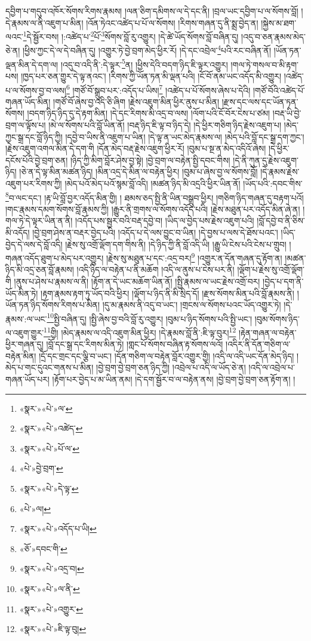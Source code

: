 དབྱིག་པ་གདུབ་འཁོར་སོགས་རིགས་རྣམས། །ལན་ཅིག་དམིགས་ལ་དེ་དང་ནི། །བྲལ་ཡང་དབྱིག་པ་ལ་སོགས་བློ། །དེ་རྣམས་ལ་ནི་འཇུག་པ་མིན། །འོན་ཏེའང་འཚེད་པ་པོ་ལ་སོགས། །རིགས་གཞན་དུ་ནི་སྨྲ་བྱེད་ན། །སྐྱེས་མ་ཐག་ལའང་\footnote{«སྣར་»«པེ་»ལ་}དེ་སྦྱོར་བས། །:འཚེད་པ་\footnote{«སྣར་»«པེ་»འཚེད་}པོ་\footnote{«སྣར་»«པེ་»པོ་ལ་}སོགས་བློ་རུ་འགྱུར། །དེ་ཚེ་ཡོད་སོགས་བློ་བཞིན་དུ། །འདུ་བ་ཅན་རྣམས་མེད་ཅེ་ན། །ཕྱིས་ཀྱང་དེ་ལ་དེ་བཞིན་དུ། །འགྱུར་ཏེ་བྱེ་བྲག་མེད་ཕྱིར་རོ། །དེ་དང་འབྲེལ་\footnote{«པེ་»བྱེ་བྲག་}པའི་རང་བཞིན་ནོ། །ཡོན་ཏན་ལྡན་མིན་དེ་དག་ལ། །འདུ་བ་འདི་ནི་:དེ་ལྟར་\footnote{«སྣར་»«པེ་»དེ་ལྟ་}ན། །ཕྱིས་དེའི་བདག་ཉིད་ཇི་ལྟར་འགྱུར། །གལ་ཏེ་གསལ་བ་མི་རྟག་པས། །ཁྱད་པར་ཅན་གྱུར་དེ་ལྟ་ནའང་། །རིགས་ཀྱི་ཡོན་ཏན་མི་ལྡན་པའི། །ངོ་བོ་ནམ་ཡང་འདོད་མི་འགྱུར། །འཚེད་པ་ལ་སོགས་བྱ་བ་ལས།\footnote{«པེ་»ལ།} །གཙོ་བོ་སྒྲུབ་པར་:འདོད་པ་ཡིས།\footnote{«སྣར་»«པེ་»འདོད་པ་ཡི།} །འཚེད་པ་པོ་སོགས་ཞེས་པ་དེའི། །གཙོ་བོའི་འཚེད་པོ་གཞན་ཡོད་མིན། །གཙོ་བོ་ཞེས་བྱ་འདི་ཅི་ཞིག །རྗེས་འཇུག་མིན་ཕྱིར་ནུས་པ་མིན། །རྫས་དང་ལས་དང་ཡོན་ཏན་སོགས། །བདག་ཉིད་ཉིད་དུ་དེ་རྟག་མིན། །དེ་དང་རིགས་མི་འདྲ་བ་ལས། །ལོག་པའི་ངོ་བོར་ངེས་པ་ཙམ། །བརྡ་ཡི་བྱེ་བྲག་ལ་ལྟོས་པ། །མེ་ལ་སོགས་པའི་བློ་ཡིན་ནོ། །བརྡ་ཉིད་ཇི་ལྟ་བ་ཉིད་དེ། །དེ་ཕྱིར་གཅིག་ཉིད་རྗེས་འཇུག་པ། །མེད་ཀྱང་སྒྲ་དང་བློ་ཉིད་ཀྱི། །དབྱེ་བ་ཡིས་ནི་འཇུག་པ་ཡིན། །དེ་ལྟ་ན་ཡང་མེད་རྣམས་ལ། །མེད་པའི་བློ་དང་སྒྲ་དག་ཀྱང་། །རྗེས་འཇུག་འགལ་མིན་དེ་དག་གི །དོན་མེད་བརྡ་རྗེས་འཇུག་ཕྱིར་རོ། །བུམ་པ་སྔ་ན་མེད་འདིའོ་ཞེས། །དེ་ཕྱིར་དངོས་པོའི་བྱེ་བྲག་ཅན། །ཉིད་ཀྱི་མིག་བློར་ཤེས་བྱ་སྟེ། །བྱེ་བྲག་ལ་བརྟེན་སྤྱི་དབང་གིས། །དེ་ནི་ཀུན་དུ་རྗེས་འཇུག་ཉིད། །ཅེ་ན་དེ་ལྟ་མིན་མཚན་ཉིད། །མིན་འདྲ་དེ་མིན་ལ་བརྟེན་ཕྱིར། །བུམ་པ་ཞེས་བྱ་ལ་སོགས་བློ། །དེ་རྣམས་རྗེས་འཇུག་པར་རིགས་ཀྱི། །མེད་པའོ་མེད་པའོ་སྙམ་བློ་འདི། །མཚན་ཉིད་མི་འདྲའི་ཕྱིར་ཡིན་ནོ། །ཡོད་པའི་:དབང་གིས་\footnote{«ཅོ་»དབང་གི་}བ་ལང་དང་། །རྟ་ཡི་བློ་བྱར་འདོད་མིན་གྱི། །
ཐམས་ཅད་སྤྱི་ནི་ཡིན་བསྒྲུབ་ཕྱིར། །གཅིག་ཉིད་གཞན་དུ་བརྟག་པའོ། །གང་རྣམས་དམག་སོགས་བློ་རྣམས་ཀྱི། །རྒྱུར་ནི་གྲགས་ལ་སོགས་འདོད་པའི། །རྗེས་མཐུན་པར་འདོད་མིན་ཞེ་ན། །གལ་ཏེ་དེ་ལྟར་ཡིན་ན་ནི། །འདོད་པས་སྦྱར་བའི་བརྡ་དབྱེ་བ། །ཡིད་ལ་བྱེད་པས་རྗེས་འཇུག་པའི། །བློ་དབྱེ་བ་ནི་ཅིས་མི་འདོད། །བྱེ་བྲག་ཤེས་ན་བརྡར་བྱེད་པའི། །འདོད་པ་དེ་ལས་བྱུང་བ་ཡིན། །དེ་བྱས་པ་ལས་དེ་ཐོས་པའང་། །ཡིད་བྱེད་དེ་ལས་དེ་བློ་འདི། །རྗེས་སུ་འགྲོ་ལྡོག་དག་གིས་ནི། །དེ་ཉིད་ཀྱི་ནི་བློ་འདི་ཡི། །རྒྱུ་ཡི་ངེས་པའི་ངེས་པ་གྲུབ། །གཞན་འདོད་ཐུག་པ་མེད་པར་འགྱུར། །རྗེས་སུ་མཐུན་པ་དང་:འདྲ་བར།\footnote{«སྣར་»«པེ་»འདྲ་བ།} །འགྱུར་ན་དོན་གཞན་དུ་རྟོག་ན། །མཚན་ཉིད་མི་འདྲ་ཅན་བློ་རྣམས། །འདི་ཉིད་ལ་བརྟེན་པ་ནི་མཆོག །འདི་ལ་ནུས་པ་ངེས་པར་ནི། །ལྡོག་པ་རྗེས་སུ་འགྲོ་ལྡོག་གི །ནུས་པ་ཤེས་པ་རྣམས་ལ་ནི། །རྟོག་ན་དེ་ཡང་མཆོག་ཡིན་ནོ། །སྤྱི་རྣམས་ལ་ཡང་རྗེས་འགྲོ་བར། །བྱེད་པ་དག་ནི་ཡོད་མིན་ཏེ། །རྟག་རྣམས་རྟག་ཏུ་ཡོད་བའི་ཕྱིར། །ལྡོག་པ་ཉིད་ནི་མི་སྲིད་དོ། །རྫས་སོགས་མིན་པའི་བློ་རྣམས་ནི། །ཡོན་ཏན་ཉིད་སོགས་རིགས་པ་མིན། །དུ་མ་རྣམས་ནི་འདུ་བ་ཡང་། །གྲངས་ལ་སོགས་པའང་ཡོད་འགྱུར་ཏེ། །དེ་རྣམས་:ལ་ཡང་\footnote{«སྣར་»«པེ་»ལ་ནི་}སྤྱི་བཞིན་དུ། །སྤྱི་ཞེས་བྱ་བའི་བློ་རུ་འགྱུར། །བུམ་པ་ཉིད་སོགས་པའི་སྤྱི་ཡང་། །བུམ་སོགས་ཉིད་ལ་འཇུག་གྱུར་\footnote{«སྣར་»«པེ་»འགྱུར་}གྱི། །མེད་རྣམས་ལ་འདི་འཇུག་མིན་ཕྱིར། །དེ་རྣམས་བློ་ནི་:ཇི་ལྟ་བུར།\footnote{«སྣར་»«པེ་»ཇི་ལྟ་བུ།} །རྟེན་གཞན་ལ་བརྟེན་ཕྱིར་གཞན་དུ། །བློ་དང་སྒྲ་དང་རིགས་མིན་ཏེ། །གླང་པོ་སོགས་བཞིན་རྟ་སོགས་ལའོ། །འདིར་ནི་དོན་གཅིག་ལ་བརྟེན་མིན། །དྲོ་དང་གྲང་དང་ལྕི་བ་ཡང་། །དོན་གཅིག་ལ་བརྟེན་བློར་འགྱུར་གྱི། །འདི་ལ་འདི་ཡང་དོན་མེད་ཉིད། །མེད་པ་གང་དུའང་གནས་པ་མིན། །བྱེ་བྲག་བྱེ་བྲག་ཅན་ཉིད་ཀྱི། །འབྲེལ་པ་འདི་ལ་ཡོད་ཅེ་ན། །འདི་ལ་འབྲེལ་པ་གཞན་ཡོད་པར། །རྟོག་པར་བྱེད་པ་མ་ཡིན་ནམ། །དེ་དག་སྦྱོར་བ་ལ་བརྟེན་ནས། །བྱེ་བྲག་བྱེ་བྲག་ཅན་རྟོག་ན། །
